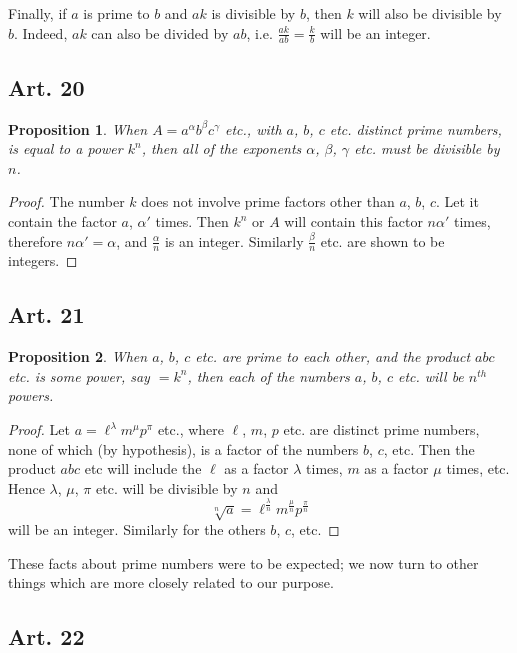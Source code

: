 \documentclass{book}
\theoremstyle{plain}
\newtheorem{proposition}{Proposition}
\theoremstyle{remark}
\begin{document}
Finally, if $a$ is prime to $b$ and $ak$ is divisible by $b$, then $k$ will also be divisible by $b$.  Indeed, $ak$ can also be divided by $ab$, i.e. $\frac{ak}{ab} = \frac{k}{b}$ will be an integer.

\subsection*{Art. 20}

\begin{proposition} When $A = a^{\alpha}b^{\beta}c^{\gamma}$ etc., with $a$, $b$, $c$ etc. distinct prime numbers, is equal to a power $k^n$, then all of the exponents $\alpha$, $\beta$, $\gamma$ etc. must be divisible by $n$. \end{proposition}

\begin{proof} The number $k$ does not involve prime factors other than $a$, $b$, $c$.   Let it contain the factor $a$, $\alpha'$ times.  Then $k^n$ or $A$ will contain this factor $n\alpha'$ times, therefore $n\alpha' = \alpha$, and $\frac{\alpha}{n}$ is an integer.  Similarly $\frac{\beta}{n}$ etc. are shown to be integers. \end{proof}

\subsection*{Art. 21} 
\begin{proposition} When $a$, $b$, $c$ etc. are prime to each other, and the product $abc$ etc. is some power, say $=k^n$, then each of the numbers $a$, $b$, $c$ etc. will be $n^{th}$ powers. \end{proposition}
\begin{proof} 
Let $a = \ell^{\lambda} m^{\mu} p^{\pi}$ etc., where $\ell$, $m$, $p$ etc. are distinct prime numbers, none of which (by hypothesis), is a factor of the numbers $b$, $c$, etc.  Then the product $abc$ etc will include the  $\ell$  as a factor $\lambda$ times, $m$ as a factor $\mu$ times, etc.  Hence $\lambda$, $\mu$, $\pi$ etc. will be divisible by $n$ and 
\[ \sqrt[n]{a} = \ell^{\frac{\lambda}{n}} m^{\frac{\mu}{n}} p^{\frac{\pi}{n}} \]
will be an integer.  Similarly for the others $b$, $c$, etc. 
\end{proof}
These facts about prime numbers were to be expected; we now turn to other things which are more closely related to our purpose.

\subsection*{Art. 22} 
\end{document}
